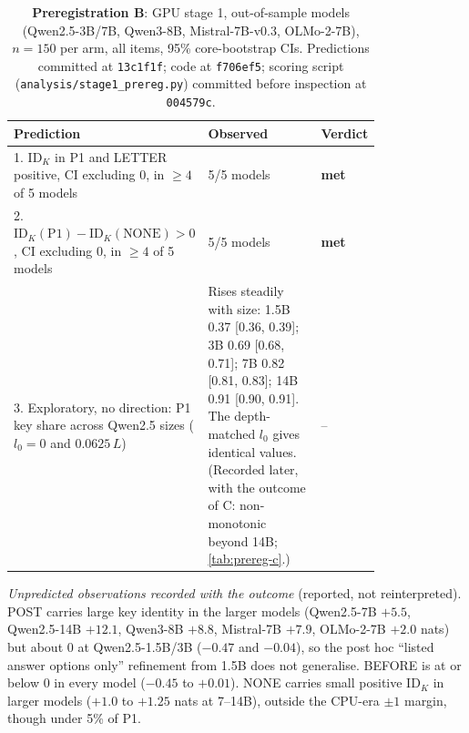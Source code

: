 \begin{table}[h]
\centering
\small
\caption{\textbf{Preregistration B}: GPU stage 1, out-of-sample models (Qwen2.5-3B/7B, Qwen3-8B, Mistral-7B-v0.3, OLMo-2-7B), $n = 150$ per arm, all items, 95\% core-bootstrap CIs. Predictions committed at \texttt{13c1f1f}; code at \texttt{f706ef5}; scoring script (\texttt{analysis/stage1\_prereg.py}) committed before inspection at \texttt{004579c}.}
\label{tab:prereg-b}
\begin{tabular}{p{0.40\linewidth}p{0.40\linewidth}l}
\toprule
Prediction & Observed & Verdict \\
\midrule
1. $\mathrm{ID}_K$ in P1 and LETTER positive, CI excluding 0, in $\geq 4$ of 5 models & 5/5 models & \textbf{met} \\
2. $\mathrm{ID}_K(\text{P1}) - \mathrm{ID}_K(\text{NONE}) > 0$, CI excluding 0, in $\geq 4$ of 5 models & 5/5 models & \textbf{met} \\
3. Exploratory, no direction: P1 key share across Qwen2.5 sizes ($l_0 = 0$ and $0.0625\,L$) & Rises steadily with size: 1.5B 0.37 [0.36, 0.39]; 3B 0.69 [0.68, 0.71]; 7B 0.82 [0.81, 0.83]; 14B 0.91 [0.90, 0.91]. The depth-matched $l_0$ gives identical values. (Recorded later, with the outcome of C: non-monotonic beyond 14B; \cref{tab:prereg-c}.) & -- \\
\bottomrule
\end{tabular}

\smallskip
\begin{minipage}{0.92\linewidth}
\footnotesize
\emph{Unpredicted observations recorded with the outcome} (reported, not reinterpreted). POST carries large key identity in the larger models (Qwen2.5-7B $+5.5$, Qwen2.5-14B $+12.1$, Qwen3-8B $+8.8$, Mistral-7B $+7.9$, OLMo-2-7B $+2.0$ nats) but about 0 at Qwen2.5-1.5B/3B ($-0.47$ and $-0.04$), so the post hoc ``listed answer options only'' refinement from 1.5B does not generalise. BEFORE is at or below 0 in every model ($-0.45$ to $+0.01$). NONE carries small positive $\mathrm{ID}_K$ in larger models ($+1.0$ to $+1.25$ nats at 7--14B), outside the CPU-era $\pm 1$ margin, though under 5\% of P1.
\end{minipage}
\end{table}

